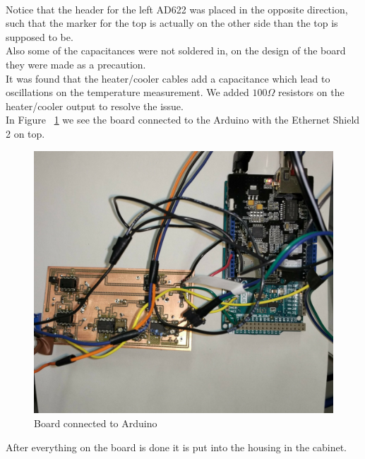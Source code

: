 \documentclass[12pt]{scrartcl}
\begin{document}
      \\ Notice that the header for the left AD622 was placed in the opposite
      direction, such that the marker for the top is actually on the other side
      than the top is supposed to be.\\
      Also some of the capacitances were not soldered in, on the design of the
      board they were made as a precaution.\\
      It was found that the heater/cooler cables add a capacitance which lead
      to oscillations on the temperature measurement. We added $100 \Omega$
      resistors on the heater/cooler output to resolve the issue.\\ In Figure~
      \ref{fig6} we see the board connected to the Arduino with the Ethernet
      Shield 2 on top.\\
      \begin{figure}
        \includegraphics[width = \textwidth]{boardwitharduino.jpg}
        \caption{Board connected to Arduino}
        \label{fig6}
      \end{figure}
      After everything on the board is done it is put into the housing in the
      cabinet.
\end{document}
